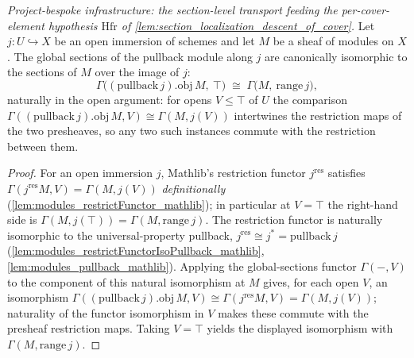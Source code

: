 \begin{lemma}
  \label{lem:pullback_gamma_top_iso}
  \textit{Project-bespoke infrastructure: the section-level transport feeding the per-cover-element
  hypothesis \(\mathrm{Hfr}\) of \cref{lem:section_localization_descent_of_cover}.}
  Let \(j : U \hookrightarrow X\) be an open immersion of schemes and let \(M\) be a sheaf of modules
  on \(X\). The global sections of the pullback module along \(j\) are canonically isomorphic to the
  sections of \(M\) over the image of \(j\):
  \[
    \Gamma\bigl((\mathrm{pullback}\,j).\mathrm{obj}\,M,\ \top\bigr)
    \;\cong\; \Gamma\bigl(M,\ \mathrm{range}\,j\bigr),
  \]
  naturally in the open argument: for opens \(V \le \top\) of \(U\) the comparison
  \(\Gamma((\mathrm{pullback}\,j).\mathrm{obj}\,M, V) \cong \Gamma(M, j(V))\) intertwines the
  restriction maps of the two presheaves, so any two such instances commute with the restriction
  between them.
\end{lemma}

\begin{proof}
  For an open immersion \(j\), Mathlib's restriction functor \(j^{\mathrm{res}}\) satisfies
  \(\Gamma(j^{\mathrm{res}} M, V) = \Gamma(M, j(V))\) \emph{definitionally}
  (\cref{lem:modules_restrictFunctor_mathlib}); in particular at \(V = \top\) the right-hand side is
  \(\Gamma(M, j(\top)) = \Gamma(M, \mathrm{range}\,j)\). The restriction functor is naturally
  isomorphic to the universal-property pullback,
  \(j^{\mathrm{res}} \cong j^{*} = \mathrm{pullback}\,j\)
  (\cref{lem:modules_restrictFunctorIsoPullback_mathlib},
  \cref{lem:modules_pullback_mathlib}). Applying the global-sections functor \(\Gamma(-, V)\) to the
  component of this natural isomorphism at \(M\) gives, for each open \(V\), an isomorphism
  \(\Gamma((\mathrm{pullback}\,j).\mathrm{obj}\,M, V) \cong \Gamma(j^{\mathrm{res}} M, V)
  = \Gamma(M, j(V))\); naturality of the functor isomorphism in \(V\) makes these commute with the
  presheaf restriction maps. Taking \(V = \top\) yields the displayed isomorphism with
  \(\Gamma(M, \mathrm{range}\,j)\).
\end{proof}

